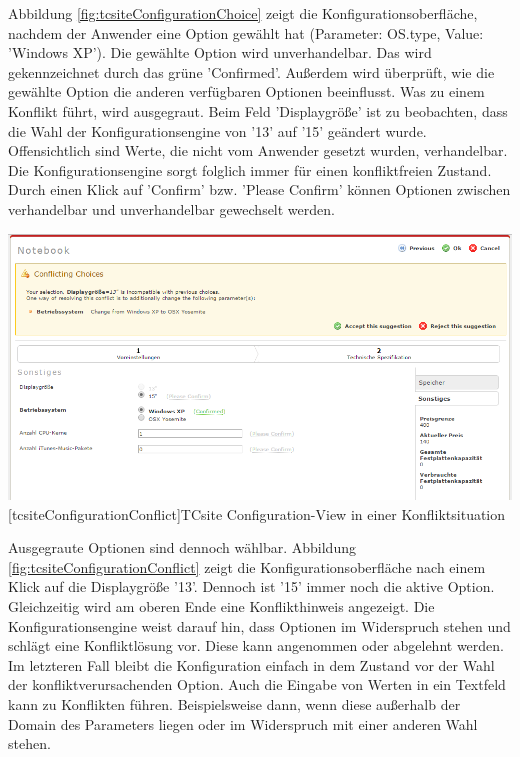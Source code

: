 \documentclass[11pt, a4paper, titlepage, listof=totoc, bibliography=totoc, index=totoc, twoside, openright, headings=normal]{scrreprt}
\begin{document}
Abbildung \ref{fig:tcsiteConfigurationChoice} zeigt die Konfigurationsoberfläche, nachdem der Anwender eine Option gewählt hat (Parameter: OS.type, Value: 'Windows XP'). Die gewählte Option wird \glqq unverhandelbar\grqq{}. Das wird gekennzeichnet durch das grüne 'Confirmed'. Außerdem wird überprüft, wie die gewählte Option die anderen verfügbaren Optionen beeinflusst. Was zu einem Konflikt führt, wird ausgegraut. Beim Feld 'Displaygröße' ist zu beobachten, dass die Wahl der Konfigurationsengine von '13' auf '15' geändert wurde. Offensichtlich sind Werte, die nicht vom Anwender gesetzt wurden, \glqq verhandelbar\grqq{}. Die Konfigurationsengine sorgt folglich immer für einen konfliktfreien Zustand. Durch einen Klick auf 'Confirm' bzw. 'Please Confirm' können Optionen zwischen verhandelbar und unverhandelbar gewechselt werden.

\vspace{1em}
\begin{minipage}{\linewidth}
	\centering
	\includegraphics[width=0.8\linewidth]{Abbildungen/tcsiteConfigurationConflict.PNG}
	[tcsiteConfigurationConflict]{TCsite Configuration-View in einer Konfliktsituation}
	\label{fig:tcsiteConfigurationConflict}
\end{minipage}
\vspace{1em}

Ausgegraute Optionen sind dennoch wählbar. Abbildung \ref{fig:tcsiteConfigurationConflict} zeigt die Konfigurationsoberfläche nach einem Klick auf die Displaygröße '13'. Dennoch ist '15' immer noch die aktive Option. Gleichzeitig wird am oberen Ende eine Konflikthinweis angezeigt. Die Konfigurationsengine weist darauf hin, dass Optionen im Widerspruch stehen und schlägt eine Konfliktlösung vor. Diese kann angenommen oder abgelehnt werden. Im letzteren Fall bleibt die Konfiguration einfach in dem Zustand vor der Wahl der konfliktverursachenden Option. Auch die Eingabe von Werten in ein Textfeld kann zu Konflikten führen. Beispielsweise dann, wenn diese außerhalb der Domain des Parameters liegen oder im Widerspruch mit einer anderen Wahl stehen. 
\end{document}
